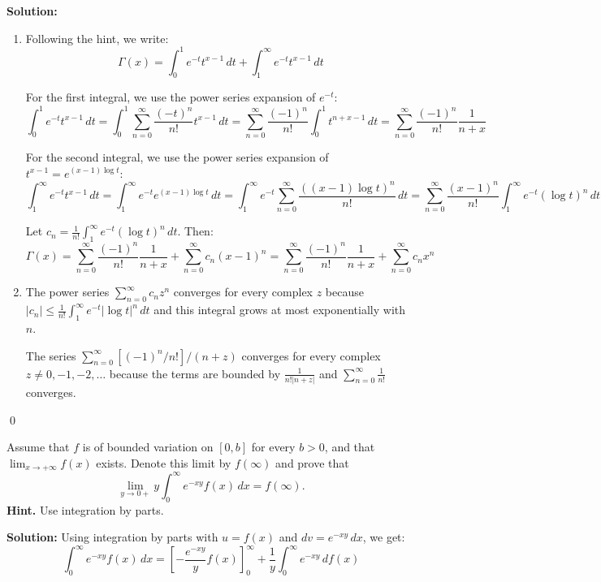 \bigskip\noindent\textbf{Solution:}
\begin{enumerate}[label=(\alph*)]
    \item Following the hint, we write:
    \[\Gamma(x) = \int_0^1 e^{-t} t^{x-1} \, dt + \int_1^\infty e^{-t} t^{x-1} \, dt\]
    
    For the first integral, we use the power series expansion of $e^{-t}$:
    \[\int_0^1 e^{-t} t^{x-1} \, dt = \int_0^1 \sum_{n=0}^{\infty} \frac{(-t)^n}{n!} t^{x-1} \, dt = \sum_{n=0}^{\infty} \frac{(-1)^n}{n!} \int_0^1 t^{n+x-1} \, dt = \sum_{n=0}^{\infty} \frac{(-1)^n}{n!} \frac{1}{n + x}\]
    
    For the second integral, we use the power series expansion of $t^{x-1} = e^{(x-1)\log t}$:
    \[\int_1^\infty e^{-t} t^{x-1} \, dt = \int_1^\infty e^{-t} e^{(x-1)\log t} \, dt = \int_1^\infty e^{-t} \sum_{n=0}^{\infty} \frac{((x-1)\log t)^n}{n!} \, dt = \sum_{n=0}^{\infty} \frac{(x-1)^n}{n!} \int_1^\infty e^{-t} (\log t)^n \, dt\]
    
    Let $c_n = \frac{1}{n!} \int_1^\infty e^{-t} (\log t)^n \, dt$. Then:
    \[\Gamma(x) = \sum_{n=0}^{\infty} \frac{(-1)^n}{n!} \frac{1}{n + x} + \sum_{n=0}^{\infty} c_n (x-1)^n = \sum_{n=0}^{\infty} \frac{(-1)^n}{n!} \frac{1}{n + x} + \sum_{n=0}^{\infty} c_n x^n\]
    
    \item The power series $\sum_{n=0}^{\infty} c_n z^n$ converges for every complex $z$ because $|c_n| \leq \frac{1}{n!} \int_1^\infty e^{-t} |\log t|^n \, dt$ and this integral grows at most exponentially with $n$.
    
    The series $\sum_{n=0}^{\infty} [(-1)^n / n!]/(n + z)$ converges for every complex $z \neq 0, -1, -2, \ldots$ because the terms are bounded by $\frac{1}{n! |n + z|}$ and $\sum_{n=0}^{\infty} \frac{1}{n!}$ converges.
\end{enumerate}\qed


\begin{problembox}
Assume that $f$ is of bounded variation on $[0, b]$ for every $b > 0$, and that $\lim_{x \to +\infty} f(x)$ exists. Denote this limit by $f(\infty)$ and prove that
\[\lim_{y \to 0+} y \int_0^\infty e^{-xy}f(x) \, dx = f(\infty).\]
\textbf{Hint.} Use integration by parts.
\end{problembox}

\bigskip\noindent\textbf{Solution:}
Using integration by parts with $u = f(x)$ and $dv = e^{-xy} \, dx$, we get:
\[\int_0^\infty e^{-xy}f(x) \, dx = \left[-\frac{e^{-xy}}{y} f(x)\right]_0^\infty + \frac{1}{y} \int_0^\infty e^{-xy} \, df(x)\]

